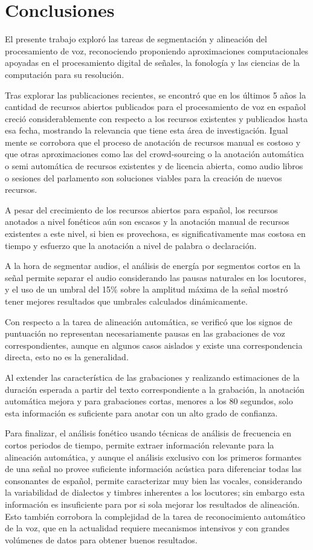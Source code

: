 \chapter{Conclusiones}

El presente trabajo exploró las tareas de segmentación y alineación del procesamiento de voz, reconociendo proponiendo aproximaciones computacionales apoyadas en el procesamiento digital de señales, la fonología y las ciencias de la computación para su resolución.

Tras explorar las publicaciones recientes, se encontró que en los últimos 5 años la cantidad de recursos abiertos publicados para el procesamiento de voz en español creció considerablemente con respecto a los recursos existentes y publicados hasta esa fecha, mostrando la relevancia que tiene esta área de investigación. Igual mente se corrobora que el proceso de anotación de recursos manual es costoso y que otras aproximaciones como las del crowd-sourcing o la anotación automática o semi automática de recursos existentes y de licencia abierta, como audio libros o sesiones del parlamento son soluciones viables para la creación de nuevos recursos.

A pesar del crecimiento de los recursos abiertos para español, los recursos anotados a nivel fonéticos aún son escasos y la anotación manual de recursos existentes a este nivel, si bien es provechosa, es significativamente mas costosa en tiempo y esfuerzo que la anotación a nivel de palabra o declaración.

A la hora de segmentar audios, el análisis de energía por segmentos cortos en la señal permite separar el audio considerando las pausas naturales en los locutores, y el uso de un umbral del 15\% sobre la amplitud máxima de la señal mostró tener mejores resultados que umbrales calculados dinámicamente.

Con respecto a la tarea de alineación automática, se verificó que los signos de puntuación no representan necesariamente pausas en las grabaciones de voz correspondientes, aunque en algunos casos aislados y existe una correspondencia directa, esto no es la generalidad. 

Al extender las característica de las grabaciones y realizando estimaciones de la duración esperada a partir del texto correspondiente a la grabación, la anotación automática mejora y para grabaciones cortas, menores a los 80 segundos, solo esta información es suficiente para anotar con un alto grado de confianza.

Para finalizar, el análisis fonético usando técnicas de análisis de frecuencia en cortos periodos de tiempo, permite extraer información relevante para la alineación automática, y aunque el análisis exclusivo con los primeros formantes de una señal no provee suficiente información acústica para diferenciar todas las consonantes de español, permite caracterizar muy bien las vocales, considerando la variabilidad de dialectos y timbres inherentes a los locutores; sin embargo esta información es insuficiente para por si sola mejorar los resultados de alineación. Esto también corrobora la complejidad de la tarea de reconocimiento automático de la voz, que en la actualidad requiere mecanismos intensivos y con grandes volúmenes de datos para obtener buenos resultados.

